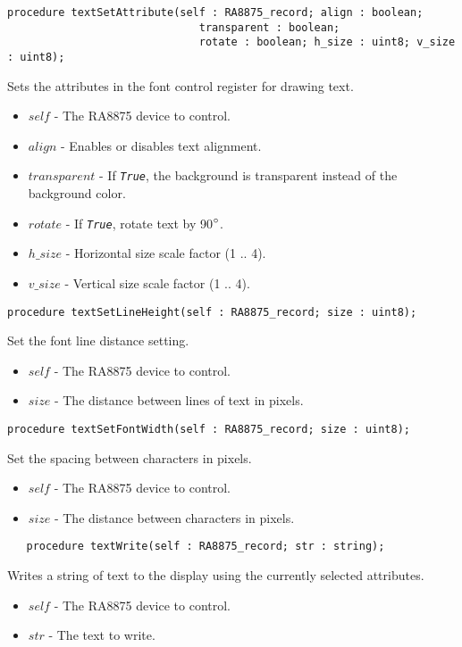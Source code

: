 \documentclass[10pt, openany]{book}
\newcommand{\constant}[1]{\emph{\texttt{#1}}}
\begin{document}
\begin{lstlisting}
procedure textSetAttribute(self : RA8875_record; align : boolean;
                              transparent : boolean;
                              rotate : boolean; h_size : uint8; v_size : uint8);
\end{lstlisting}
Sets the attributes in the font control register for drawing text.
\begin{itemize}
  \item $self$ - The RA8875 device to control.
  \item $align$ - Enables or disables text alignment.
  \item $transparent$ - If \constant{True}, the background is transparent instead of the background color.
  \item $rotate$ - If \constant{True}, rotate text by 90$\degree{}$.
  \item $h\_size$ - Horizontal size scale factor (1 .. 4).
  \item $v\_size$ - Vertical size scale factor (1 .. 4).
\end{itemize}

\begin{lstlisting}
procedure textSetLineHeight(self : RA8875_record; size : uint8);
\end{lstlisting}
Set the font line distance setting.
\begin{itemize}
  \item $self$ - The RA8875 device to control.
  \item $size$ - The distance between lines of text in pixels.
\end{itemize}

\begin{lstlisting}
procedure textSetFontWidth(self : RA8875_record; size : uint8);
\end{lstlisting}
Set the spacing between characters in pixels.
\begin{itemize}
  \item $self$ - The RA8875 device to control.
  \item $size$ - The distance between characters in pixels.
\end{itemize}

\begin{lstlisting}
   procedure textWrite(self : RA8875_record; str : string);
\end{lstlisting}
Writes a string of text to the display using the currently selected attributes.
\begin{itemize}
  \item $self$ - The RA8875 device to control.
  \item $str$ - The text to write.
\end{itemize}
\end{document}
